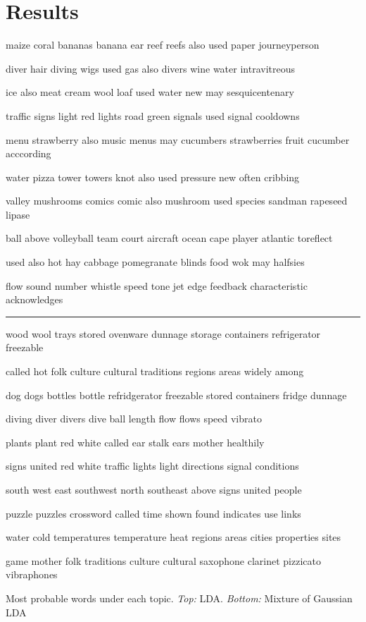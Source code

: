 \documentclass[11pt]{article}
\begin{document}
\section{Results}
\begin{table}
{\tiny
\par maize coral bananas banana ear reef reefs also used paper journeyperson
\par diver hair diving wigs used gas also divers wine water intravitreous
\par ice also meat cream wool loaf used water new may sesquicentenary
\par traffic signs light red lights road green signals used signal cooldowns
\par menu strawberry also music menus may cucumbers strawberries fruit cucumber acccording
\par water pizza tower towers knot also used pressure new often cribbing
\par valley mushrooms comics comic also mushroom used species sandman rapeseed lipase
\par ball above volleyball team court aircraft ocean cape player atlantic toreflect
\par used also hot hay cabbage pomegranate blinds food wok may halfsies
\par flow sound number whistle speed tone jet edge feedback characteristic acknowledges
}

\rule{\columnwidth}{1pt}

{\tiny 
\par wood wool trays stored ovenware dunnage storage containers refrigerator freezable 
\par called hot folk culture cultural traditions regions areas widely among 
\par dog dogs bottles bottle refridgerator freezable stored containers fridge dunnage 
\par diving diver divers dive ball length flow flows speed vibrato 
\par plants plant red white called ear stalk ears mother healthily 
\par signs united red white traffic lights light directions signal conditions 
\par south west east southwest north southeast above signs united people 
\par puzzle puzzles crossword called time shown found indicates use links 
\par water cold temperatures temperature heat regions areas cities properties sites 
\par game mother folk traditions culture cultural saxophone clarinet pizzicato vibraphones 
}

\caption{\label{tbl:topics} Most probable words under each topic. \emph{Top:} LDA. \emph{Bottom:} Mixture of Gaussian LDA}
\end{table}
\end{document}
